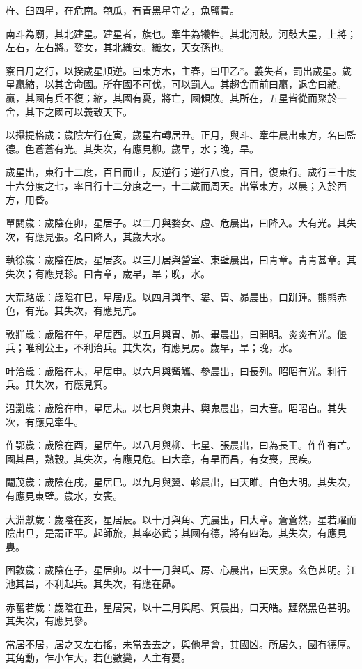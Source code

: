 \documentclass[10pt,fontset=adobe,UTF8,twoside]{ctexrep}
\begin{document}
杵、臼四星，在危南。匏瓜，有青黑星守之，魚鹽貴。

南斗為廟，其北建星。建星者，旗也。牽牛為犧牲。其北河鼓。河鼓大星，上將；左右，左右將。婺女，其北織女。織女，天女孫也。

察日月之行，以揆歲星順逆。曰東方木，主春，曰甲乙*。義失者，罰出歲星。歲星贏縮，以其舍命國。所在國不可伐，可以罰人。其趨舍而前曰贏，退舍曰縮。贏，其國有兵不復；縮，其國有憂，將亡，國傾敗。其所在，五星皆從而聚於一舍，其下之國可以義致天下。

以攝提格歲：歲陰左行在寅，歲星右轉居丑。正月，與斗、牽牛晨出東方，名曰監德。色蒼蒼有光。其失次，有應見柳。歲早，水；晚，旱。

歲星出，東行十二度，百日而止，反逆行；逆行八度，百日，復東行。歲行三十度十六分度之七，率日行十二分度之一，十二歲而周天。出常東方，以晨；入於西方，用昏。

單閼歲：歲陰在卯，星居子。以二月與婺女、虛、危晨出，曰降入。大有光。其失次，有應見張。名曰降入，其歲大水。

執徐歲：歲陰在辰，星居亥。以三月居與營室、東壁晨出，曰青章。青青甚章。其失次；有應見軫。曰青章，歲早，旱；晚，水。

大荒駱歲：歲陰在巳，星居戌。以四月與奎、婁、胃、昴晨出，曰跰踵。熊熊赤色，有光。其失次，有應見亢。

敦牂歲：歲陰在午，星居酉。以五月與胃、昴、畢晨出，曰開明。炎炎有光。偃兵；唯利公王，不利治兵。其失次，有應見房。歲早，旱；晚，水。

叶洽歲：歲陰在未，星居申。以六月與觜觿、參晨出，曰長列。昭昭有光。利行兵。其失次，有應見箕。

涒灘歲：歲陰在申，星居未。以七月與東井、輿鬼晨出，曰大音。昭昭白。其失次，有應見牽牛。

作鄂歲：歲陰在酉，星居午。以八月與柳、七星、張晨出，曰為長王。作作有芒。國其昌，熟穀。其失次，有應見危。曰大章，有旱而昌，有女喪，民疾。

閹茂歲：歲陰在戌，星居巳。以九月與翼、軫晨出，曰天睢。白色大明。其失次，有應見東壁。歲水，女喪。

大淵獻歲：歲陰在亥，星居辰。以十月與角、亢晨出，曰大章。蒼蒼然，星若躍而陰出旦，是謂正平。起師旅，其率必武；其國有德，將有四海。其失次，有應見婁。

困敦歲：歲陰在子，星居卯。以十一月與氐、房、心晨出，曰天泉。玄色甚明。江池其昌，不利起兵。其失次，有應在昴。

赤奮若歲：歲陰在丑，星居寅，以十二月與尾、箕晨出，曰天皓。黫然黑色甚明。其失次，有應見參。

當居不居，居之又左右搖，未當去去之，與他星會，其國凶。所居久，國有德厚。其角動，乍小乍大，若色數變，人主有憂。
\end{document}

